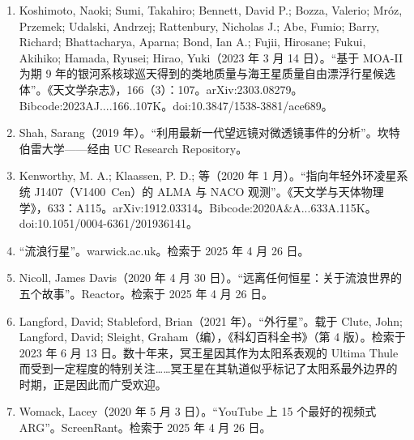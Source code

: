 \begin{enumerate}
\item Koshimoto, Naoki; Sumi, Takahiro; Bennett, David P.; Bozza, Valerio; Mróz, Przemek; Udalski, Andrzej; Rattenbury, Nicholas J.; Abe, Fumio; Barry, Richard; Bhattacharya, Aparna; Bond, Ian A.; Fujii, Hirosane; Fukui, Akihiko; Hamada, Ryusei; Hirao, Yuki（2023 年 3 月 14 日）。“基于 MOA-II 为期 9 年的银河系核球巡天得到的类地质量与海王星质量自由漂浮行星候选体”。《天文学杂志》，166（3）：107。arXiv:2303.08279。Bibcode:2023AJ....166..107K。doi:10.3847/1538-3881/ace689。  
\item Shah, Sarang（2019 年）。“利用最新一代望远镜对微透镜事件的分析”。坎特伯雷大学——经由 UC Research Repository。  
\item Kenworthy, M. A.; Klaassen, P. D.; 等（2020 年 1 月）。“指向年轻外环凌星系统 J1407（V1400~Cen）的 ALMA 与 NACO 观测”。《天文学与天体物理学》，633：A115。arXiv:1912.03314。Bibcode:2020A\&A...633A.115K。doi:10.1051/0004-6361/201936141。  
\item “流浪行星”。warwick.ac.uk。检索于 2025 年 4 月 26 日。  
\item Nicoll, James Davis（2020 年 4 月 30 日）。“远离任何恒星：关于流浪世界的五个故事”。Reactor。检索于 2025 年 4 月 26 日。  
\item Langford, David; Stableford, Brian（2021 年）。“外行星”。载于 Clute, John; Langford, David; Sleight, Graham（编），《科幻百科全书》（第 4 版）。检索于 2023 年 6 月 13 日。数十年来，冥王星因其作为太阳系表观的 Ultima Thule 而受到一定程度的特别关注……冥王星在其轨道似乎标记了太阳系最外边界的时期，正是因此而广受欢迎。  
\item Womack, Lacey（2020 年 5 月 3 日）。“YouTube 上 15 个最好的视频式 ARG”。ScreenRant。检索于 2025 年 4 月 26 日。
\end{enumerate}